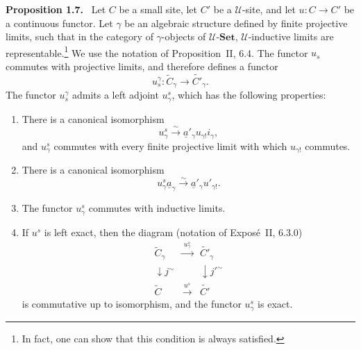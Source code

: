 \documentclass[11pt]{article}
\newcommand{\U}{\mathcal{U}}
\newcommand{\Set}{\mathbf{Set}}
\newenvironment{statement}[1]{\par\medskip\noindent\textbf{#1.}\ }{\par\medskip}
\begin{document}
\begin{statement}{Proposition 1.7}
Let \(C\) be a small site, let \(C'\) be a \(\U\)-site, and let \(u:C\to C'\) be a continuous functor. Let \(\gamma\) be an algebraic structure defined by finite projective limits, such that in the category of \(\gamma\)-objects of \(\U\)-\(\Set\), \(\U\)-inductive limits are representable.\footnote{In fact, one can show that this condition is always satisfied.} We use the notation of Proposition~II, 6.4. The functor \(u_s\) commutes with projective limits, and therefore defines a functor
\[
u_s^\gamma: \widetilde C_{\gamma}\longrightarrow \widetilde {C'}_{\gamma}.
\]
The functor \(u_s^\gamma\) admits a left adjoint \(u^s_\gamma\), which has the following properties:
\begin{enumerate}[label=\arabic*)]
\item There is a canonical isomorphism
\[
u^s_{\gamma}\xrightarrow{\sim}\underline a'_{\gamma}u_{\gamma!}i_{\gamma},
\]
and \(u^s_\gamma\) commutes with every finite projective limit with which \(u_{\gamma!}\) commutes.

\item There is a canonical isomorphism
\[
u^s_{\gamma}\underline a_\gamma\xrightarrow{\sim}\underline a'_\gamma u'_{\gamma!}.
\]

\item The functor \(u^s_\gamma\) commutes with inductive limits.

\item If \(u^s\) is left exact, then the diagram (notation of Expos\'e~II, 6.3.0)
\[
\begin{array}{ccc}
\widetilde C_\gamma&\xrightarrow{\ u^s_\gamma\ }&\widetilde {C'}_\gamma\\
\downarrow{\scriptstyle j^{\sim}}&&\downarrow{\scriptstyle {j'}^{\sim}}\\
\widetilde C&\xrightarrow{\ u^s\ }&\widetilde {C'}
\end{array}
\]
is commutative up to isomorphism, and the functor \(u^s_\gamma\) is exact.


\end{enumerate}
\end{statement}
\end{document}
